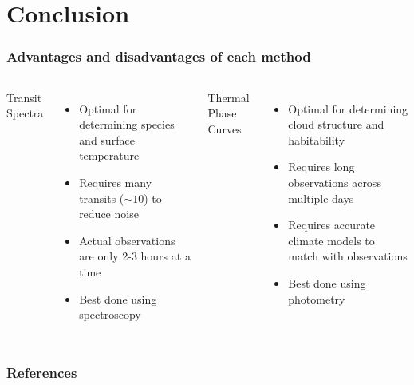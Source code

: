 \documentclass{beamer}
\begin{document}
\section{Conclusion}
\begin{frame}
    \frametitle{Advantages and disadvantages of each method}
    \begin{columns}
        {\Large Transit Spectra}
        \begin{itemize}
            \item Optimal for determining species and surface temperature

            \item Requires many transits ($\sim10$) to reduce noise

            \item Actual observations are only 2-3 hours at a time

            \item Best done using spectroscopy
        \end{itemize}
        {\Large Thermal Phase Curves}
        \begin{itemize}
            \item Optimal for determining cloud structure and habitability

            \item Requires long observations across multiple days

            \item Requires accurate climate models to match with observations

            \item Best done using photometry
        \end{itemize}
    \end{columns}
\end{frame}

\begin{frame}
    \frametitle{References}
    
    
\end{frame}
\end{document}
